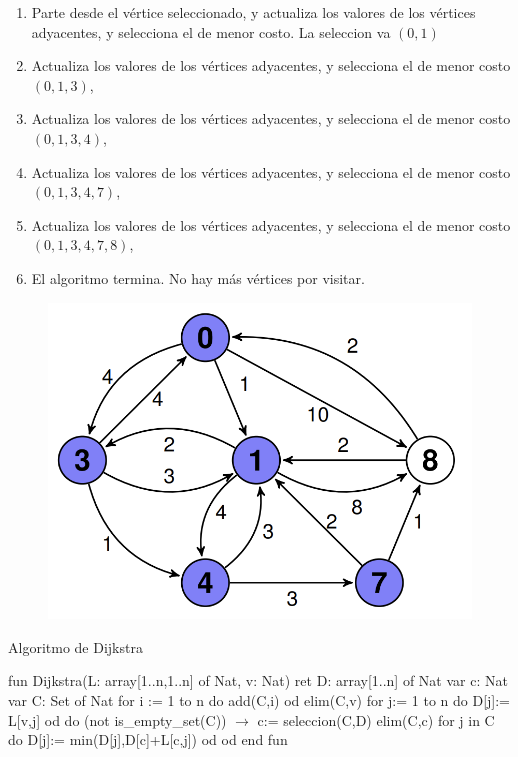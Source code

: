 \begin{enumerate}
    \item Parte desde el vértice seleccionado, y actualiza los valores de los vértices adyacentes, y selecciona el de menor costo. La seleccion va $(0,1)$
    \item  Actualiza los valores de los vértices adyacentes, y selecciona el de menor costo $(0,1,3)$,
    \item  Actualiza los valores de los vértices adyacentes, y selecciona el de menor costo $(0,1,3,4)$,
    \item  Actualiza los valores de los vértices adyacentes, y selecciona el de menor costo $(0,1,3,4,7)$,
    \item  Actualiza los valores de los vértices adyacentes, y selecciona el de menor costo $(0,1,3,4,7,8)$,
    \item El algoritmo termina. No hay más vértices por visitar.
\end{enumerate}
\newpage
\begin{figure}[h]
    \centering
    \includegraphics[scale=0.5]{estáticos/figura9.png}
\end{figure}

\begin{codebox}{Algoritmo de Dijkstra}
\begin{pascallike}
fun Dijkstra(L: array[1..n,1..n] of Nat, v: Nat) ret D: array[1..n] of Nat
    var c: Nat
    var C: Set of Nat
    for i := 1 to n do add(C,i) od
    elim(C,v)
    for j:= 1 to n do D[j]:= L[v,j] od
    do (not is_empty_set(C)) $\rightarrow$
        c:= seleccion(C,D)
        elim(C,c)
        for j in C do D[j]:= min(D[j],D[c]+L[c,j]) od
    od
end fun
\end{pascallike}
\end{codebox}

